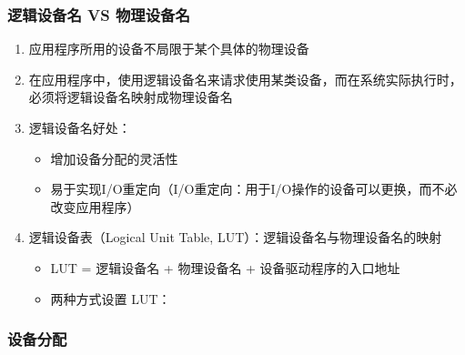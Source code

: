 \documentclass[./computer-organization-and-architecture.tex]{subfiles}
\begin{document}
    \subsubsection{逻辑设备名 VS 物理设备名}

    \begin{enumerate}
        \item 应用程序所用的设备不局限于某个具体的物理设备
        \item 在应用程序中，使用逻辑设备名来请求使用某类设备，而在系统实际执行时，必须将逻辑设备名映射成物理设备名
        \item 逻辑设备名好处：
        \begin{itemize}
            \item 增加设备分配的灵活性
            \item 易于实现I/O重定向（I/O重定向：用于I/O操作的设备可以更换，而不必改变应用程序）
        \end{itemize}
        \item 逻辑设备表（Logical Unit Table, LUT）：逻辑设备名与物理设备名的映射
        \begin{itemize}
            \item LUT = 逻辑设备名 + 物理设备名 + 设备驱动程序的入口地址
            \item 两种方式设置 LUT：
        \end{itemize}
    \end{enumerate}

    \subsubsection{设备分配}
\end{document}
